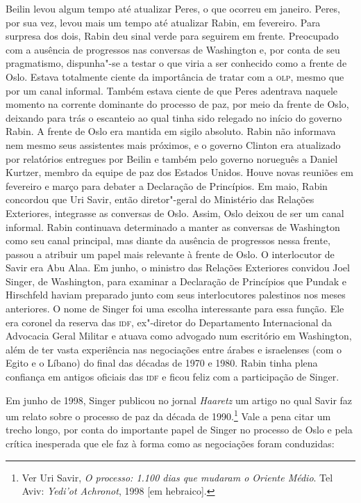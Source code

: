 Beilin levou algum tempo até atualizar Peres, o que ocorreu em janeiro.
Peres, por sua vez, levou mais um tempo até atualizar Rabin, em
fevereiro. Para surpresa dos dois, Rabin deu sinal verde para seguirem
em frente. Preocupado com a ausência de progressos nas conversas de
Washington e, por conta de seu pragmatismo, dispunha"-se a testar o que
viria a ser conhecido como a frente de Oslo. Estava totalmente ciente da
importância de tratar com a \textsc{olp}, mesmo que por um canal informal. Também
estava ciente de que Peres adentrava naquele momento na corrente
dominante do processo de paz, por meio da frente de Oslo, deixando para
trás o escanteio ao qual tinha sido relegado no início do governo Rabin.
A frente de Oslo era mantida em sigilo absoluto. Rabin não informava nem
mesmo seus assistentes mais próximos, e o governo Clinton era atualizado
por relatórios entregues por Beilin e também pelo governo norueguês a
Daniel Kurtzer, membro da equipe de paz dos Estados Unidos. Houve novas
reuniões em fevereiro e março para debater a Declaração de Princípios.
Em maio, Rabin concordou que Uri Savir, então diretor"-geral do
Ministério das Relações Exteriores, integrasse as conversas de Oslo.
Assim, Oslo deixou de ser um canal informal. Rabin continuava
determinado a manter as conversas de Washington como seu canal
principal, mas diante da ausência de progressos nessa frente, passou a
atribuir um papel mais relevante à frente de Oslo. O interlocutor de
Savir era Abu Alaa. Em junho, o ministro das Relações Exteriores
convidou Joel Singer, de Washington, para examinar a Declaração de
Princípios que Pundak e Hirschfeld haviam preparado junto com seus
interlocutores palestinos nos meses anteriores. O nome de Singer foi uma
escolha interessante para essa função. Ele era coronel da reserva das
\textsc{idf}, ex"-diretor do Departamento Internacional da Advocacia Geral Militar
e atuava como advogado num escritório em Washington, além
de ter vasta experiência nas negociações entre árabes e israelenses (com
o Egito e o Líbano) do final das décadas de 1970 e 1980. Rabin tinha
plena confiança em antigos oficiais das \textsc{idf} e ficou feliz com a
participação de Singer.

Em junho de 1998, Singer publicou no jornal \textit{Haaretz} um artigo no
qual Savir faz um relato sobre o processo de paz da década de
1990.\footnote{Ver Uri Savir, \textit{O processo: 1.100 dias que mudaram o Oriente Médio}.
Tel Aviv: \textit{Yedi'ot Achronot}, 1998 {[}em hebraico{]}.} Vale a pena
citar um trecho longo, por conta do importante papel de Singer no
processo de Oslo e pela crítica inesperada que ele faz à forma como as
negociações foram conduzidas:

